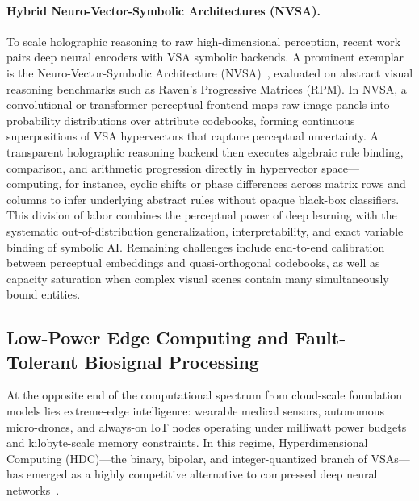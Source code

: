 \paragraph{Hybrid Neuro-Vector-Symbolic Architectures (NVSA).}
To scale holographic reasoning to raw high-dimensional perception, recent work pairs deep neural encoders with VSA symbolic backends.
A prominent exemplar is the Neuro-Vector-Symbolic Architecture (NVSA)~\cite{HERSCHE_2023_NVSA}, evaluated on abstract visual reasoning benchmarks such as Raven's Progressive Matrices (RPM).
In NVSA, a convolutional or transformer perceptual frontend maps raw image panels into probability distributions over attribute codebooks, forming continuous superpositions of VSA hypervectors that capture perceptual uncertainty.
A transparent holographic reasoning backend then executes algebraic rule binding, comparison, and arithmetic progression directly in hypervector space---computing, for instance, cyclic shifts or phase differences across matrix rows and columns to infer underlying abstract rules without opaque black-box classifiers.
This division of labor combines the perceptual power of deep learning with the systematic out-of-distribution generalization, interpretability, and exact variable binding of symbolic AI.
Remaining challenges include end-to-end calibration between perceptual embeddings and quasi-orthogonal codebooks, as well as capacity saturation when complex visual scenes contain many simultaneously bound entities.

\subsection{Low-Power Edge Computing and Fault-Tolerant Biosignal Processing}\label{sec:applications:edge}

At the opposite end of the computational spectrum from cloud-scale foundation models lies extreme-edge intelligence: wearable medical sensors, autonomous micro-drones, and always-on IoT nodes operating under milliwatt power budgets and kilobyte-scale memory constraints.
In this regime, Hyperdimensional Computing (HDC)---the binary, bipolar, and integer-quantized branch of VSAs---has emerged as a highly competitive alternative to compressed deep neural networks~\cite{RAHIMI_HDC_EDGE,GE_2020_HDC_CLASSIFICATION,KLEYKO_VSA_SURVEY}.

